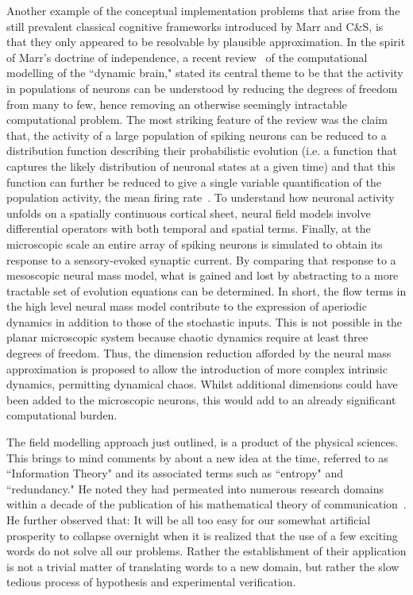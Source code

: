 \documentclass[11pt,3p,twocolumn]{JMN}
\begin{document}
Another example of the conceptual implementation problems that arise from the still prevalent classical cognitive frameworks introduced by Marr and C\&S, is that they only appeared to be resolvable by plausible approximation. In the spirit of Marr's doctrine of independence, a recent review~\citep{deco08} of the computational modelling of the ``dynamic brain," stated its central theme to be that the activity in populations of neurons can be understood by reducing the degrees of freedom from many to few, hence removing an otherwise seemingly intractable computational problem. The most striking feature of the review was the claim that, the activity of a large population of spiking neurons can be reduced to a distribution function describing their probabilistic evolution (i.e. a function that captures the likely distribution of neuronal states at a given time) and that this function can further be reduced to give a single variable quantification of the population activity, the mean firing rate~\citep{deco08}. To understand how neuronal activity unfolds on a spatially continuous cortical sheet, neural field models involve differential operators with both temporal and spatial terms. Finally, at the microscopic scale an entire array of spiking neurons is simulated to obtain its response to a sensory-evoked synaptic current. By comparing that response to a mesoscopic neural mass model, what is gained and lost by abstracting to a more tractable set of evolution equations can be determined. In short, the flow terms in the high level neural mass model contribute to the expression of aperiodic dynamics in addition to those of the stochastic inputs. This is not possible in the planar microscopic system because chaotic dynamics require at least three degrees of freedom. Thus, the dimension reduction afforded by the neural mass approximation is proposed to allow the introduction of more complex intrinsic dynamics, permitting dynamical chaos. Whilst additional dimensions could have been added to the microscopic neurons, this would add to an already significant computational burden.

The field modelling approach just outlined, is a product of the physical sciences. This brings to mind comments by \citet{shannon56} about a new idea at the time, referred to as ``Information Theory" and its associated terms such as ``entropy" and ``redundancy." He noted they had permeated into numerous research domains within a decade of the publication of his mathematical theory of communication~\citep{shannon48}. He further observed that: It will be all too easy for our somewhat artificial prosperity to collapse overnight when it is realized that the use of a few exciting words do not solve all our problems. Rather the establishment of their application is not a trivial matter of translating words to a new domain, but rather the slow tedious process of hypothesis and experimental verification.
\end{document}
